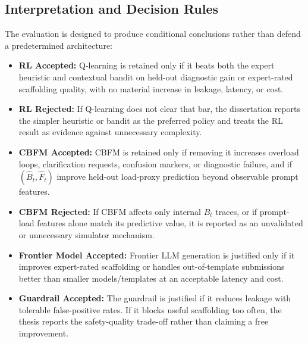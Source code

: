 \documentclass[11pt,a4paper]{report}
\begin{document}
\subsection{Interpretation and Decision Rules}
The evaluation is designed to produce conditional conclusions rather than defend a predetermined architecture:
\begin{itemize}
    \item \textbf{RL Accepted:} Q-learning is retained only if it beats both the expert heuristic and contextual bandit on held-out diagnostic gain or expert-rated scaffolding quality, with no material increase in leakage, latency, or cost.
    \item \textbf{RL Rejected:} If Q-learning does not clear that bar, the dissertation reports the simpler heuristic or bandit as the preferred policy and treats the RL result as evidence against unnecessary complexity.
    \item \textbf{CBFM Accepted:} CBFM is retained only if removing it increases overload loops, clarification requests, confusion markers, or diagnostic failure, and if $(\hat{B}_t,\hat{F}_t)$ improve held-out load-proxy prediction beyond observable prompt features.
    \item \textbf{CBFM Rejected:} If CBFM affects only internal $B_t$ traces, or if prompt-load features alone match its predictive value, it is reported as an unvalidated or unnecessary simulator mechanism.
    \item \textbf{Frontier Model Accepted:} Frontier LLM generation is justified only if it improves expert-rated scaffolding or handles out-of-template submissions better than smaller models/templates at an acceptable latency and cost.
    \item \textbf{Guardrail Accepted:} The guardrail is justified if it reduces leakage with tolerable false-positive rates. If it blocks useful scaffolding too often, the thesis reports the safety-quality trade-off rather than claiming a free improvement.
\end{itemize}
\end{document}
